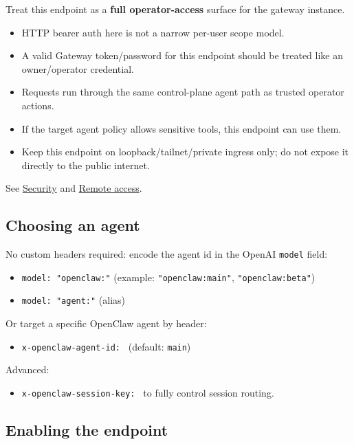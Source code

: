 Treat this endpoint as a \textbf{full operator-access} surface for the gateway instance.

\begin{itemize}
  \item HTTP bearer auth here is not a narrow per-user scope model.
  \item A valid Gateway token/password for this endpoint should be treated like an owner/operator credential.
  \item Requests run through the same control-plane agent path as trusted operator actions.
  \item If the target agent policy allows sensitive tools, this endpoint can use them.
  \item Keep this endpoint on loopback/tailnet/private ingress only; do not expose it directly to the public internet.
\end{itemize}


See \href{/gateway/security}{Security} and \href{/gateway/remote}{Remote access}.

\subsection{Choosing an agent}


No custom headers required: encode the agent id in the OpenAI \texttt{model} field:

\begin{itemize}
  \item \texttt{model: "openclaw:"} (example: \texttt{"openclaw:main"}, \texttt{"openclaw:beta"})
  \item \texttt{model: "agent:"} (alias)
\end{itemize}


Or target a specific OpenClaw agent by header:

\begin{itemize}
  \item \texttt{x-openclaw-agent-id: } (default: \texttt{main})
\end{itemize}


Advanced:

\begin{itemize}
  \item \texttt{x-openclaw-session-key: } to fully control session routing.
\end{itemize}


\subsection{Enabling the endpoint}


